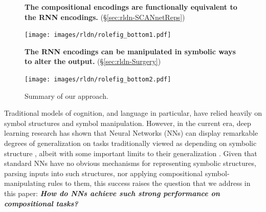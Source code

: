 \begin{figure}
        \begin{tcolorbox}[width=.5\columnwidth, colback={myblue}, coltitle=white, toptitle=3pt, bottomtitle=3pt, colframe={mybluebox},outer arc=2mm,colupper=black, valign=center, halign=left, boxsep = 0pt, title={\textbf{Results:}}, halign title=center, segmentation style={solid, line width=1pt}, left=3pt]
            \def\arraystretch{1.0}%
            
        \textbf{The compositional encodings are functionally equivalent to the RNN encodings.} (\S \ref{sec:rldn-SCANnetReps})
    
        \texttt{[image: images/rldn/rolefig\_bottom1.pdf]}
            
        \textbf{The RNN encodings can be manipulated in symbolic ways to alter the output.} (\S \ref{sec:rldn-Surgery})
        
        \texttt{[image: images/rldn/rolefig\_bottom2.pdf]}
        
        \end{tcolorbox}
        
        \caption{Summary of our approach.}
        \label{fig:my_label}
    \end{figure}

Traditional models of cognition, and language in particular, have relied heavily on symbol structures and symbol manipulation.
However, in the current era, deep learning research has shown that Neural Networks (NNs) can display remarkable degrees of generalization on tasks traditionally viewed as depending on symbolic structure  \citep{googlenmt, mccoy}, albeit with some important limits to their generalization \citep{lake2018generalization}.
Given that standard NNs have no obvious mechanisms for representing symbolic structures, parsing inputs into such structures, nor applying compositional symbol-manipulating rules to them, this success raises the question that we address in this paper:\textbf{\emph{ How do NNs achieve such strong performance on compositional tasks?}} 

